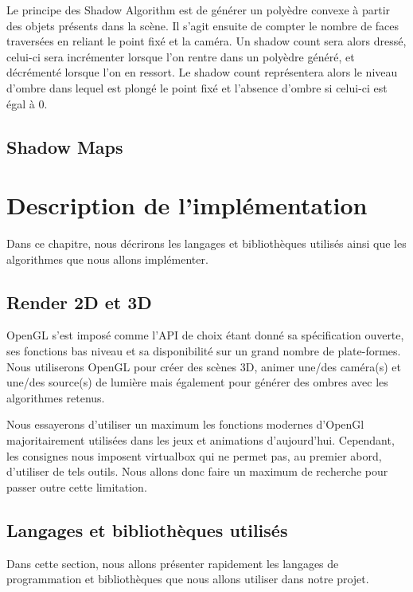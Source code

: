 \documentclass[a4paper,10pt]{report}
\begin{document}
Le principe des Shadow Algorithm est de générer un polyèdre convexe à partir des objets présents dans la scène. Il s'agit ensuite de compter le nombre de faces traversées en reliant le point fixé et la caméra. Un shadow count sera alors dressé, celui-ci sera incrémenter lorsque l'on rentre dans un polyèdre généré, et décrémenté lorsque l'on en ressort. Le shadow count représentera alors le niveau d'ombre dans lequel est plongé le point fixé et l'absence d'ombre si celui-ci est égal à 0.\cite{surveyofshadowalgorithms}



\section{Shadow Maps}


\chapter{Description de l’implémentation}

Dans ce chapitre, nous décrirons les langages et bibliothèques utilisés ainsi que les algorithmes que nous allons implémenter.

\section{Render 2D et 3D}
OpenGL s'est imposé comme l'API de choix étant donné sa spécification ouverte, ses fonctions bas niveau et sa disponibilité sur un grand nombre de plate-formes.
Nous utiliserons OpenGL pour créer des scènes 3D, animer une/des caméra(s) et une/des source(s) de lumière mais également pour générer des ombres avec les algorithmes retenus.

Nous essayerons d'utiliser un maximum les fonctions modernes d'OpenGl majoritairement utilisées dans les jeux et animations d'aujourd'hui. Cependant, les consignes nous imposent virtualbox qui ne permet pas, au premier abord, d'utiliser de tels outils. Nous allons donc faire un maximum de recherche pour passer outre cette limitation.

\section{Langages et bibliothèques utilisés}

Dans cette section, nous allons présenter rapidement les langages de programmation et bibliothèques que nous allons utiliser dans notre projet.
\end{document}
